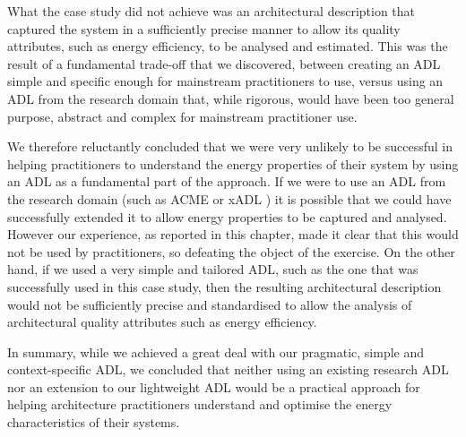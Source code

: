   What the case study did not achieve was an architectural description that captured the system in a sufficiently precise manner to allow its quality attributes, such as energy efficiency, to be analysed and estimated.  This was the result of a fundamental trade-off that we discovered, between creating an ADL simple and specific enough for mainstream practitioners to use, versus using an ADL from the research domain that, while rigorous, would have been too general purpose, abstract and complex for mainstream practitioner use.

  We therefore reluctantly concluded that we were very unlikely to be successful in helping practitioners to understand the energy properties of their system by using an ADL as a fundamental part of the approach.  If we were to use an ADL from the research domain (such as ACME \cite{garlan1997-acme} or xADL \cite{khare2001-xadl}) it is possible that we could have successfully extended it to allow energy properties to be captured and analysed.  However our experience, as reported in this chapter, made it clear that this would not be used by practitioners, so defeating the object of the exercise.  On the other hand, if we used a very simple and tailored ADL, such as the one that was successfully used in this case study, then the resulting architectural description would not be sufficiently precise and standardised to allow the analysis of architectural quality attributes such as energy efficiency.

  In summary, while we achieved a great deal with our pragmatic, simple and context-specific ADL, we concluded that neither using an existing research ADL nor an extension to our lightweight ADL would be a practical approach for helping architecture practitioners understand and optimise the energy characteristics of their systems.


